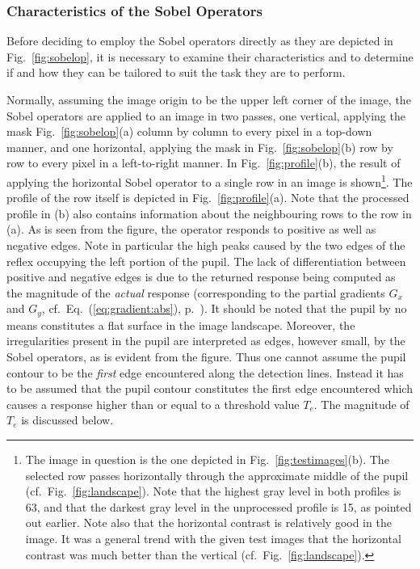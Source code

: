 \subsubsection{Characteristics of the Sobel Operators}


Before deciding to employ the Sobel operators directly as they are
depicted in Fig.~\ref{fig:sobelop}, it is necessary to examine their
characteristics and to determine if and how they can be tailored to
suit the task they are to perform.

Normally, assuming the image origin to be the upper left corner of the
image, the Sobel operators are applied to an image in two passes, one
vertical, applying the mask Fig.~\ref{fig:sobelop}(a) column by column
to every pixel in a top-down manner, and one horizontal, applying the
mask in Fig.~\ref{fig:sobelop}(b) row by row to every pixel in a
left-to-right manner.  In Fig.~\ref{fig:profile}(b), the result of
applying the horizontal Sobel operator to a single row in an image is
shown\footnote{The image in question is the one depicted in
  Fig.~\ref{fig:testimages}(b).  The selected row passes horizontally
  through the approximate middle of the pupil (cf.\ 
  Fig.~\ref{fig:landscape}).  Note that the highest gray level in both
  profiles is 63, and that the darkest gray level in the unprocessed
  profile is 15, as pointed out earlier.  Note also that the
  horizontal contrast is relatively good in the image.  It was a
  general trend with the given test images that the horizontal
  contrast was much better than the vertical (cf.\ 
  Fig.~\ref{fig:landscape}).}.  The profile of the row itself is
depicted in Fig.~\ref{fig:profile}(a).  Note that the processed
profile in (b) also contains information about the neighbouring rows
to the row in (a).  As is seen from the figure, the operator responds
to positive as well as negative edges.  Note in particular the high
peaks caused by the two edges of the reflex occupying the left portion
of the pupil.  The lack of differentiation between positive and
negative edges is due to the returned response being computed as the
magnitude of the {\em actual\/} response (corresponding to the partial
gradients $G_{x}$ and $G_{y}$, cf.\ Eq.~(\ref{eq:gradient:abs}),
p.~\pageref{eq:gradient:abs}).  It should be noted that the pupil by
no means constitutes a flat surface in the image landscape.  Moreover,
the irregularities present in the pupil are interpreted as edges,
however small, by the Sobel operators, as is evident from the figure.
Thus one cannot assume the pupil contour to be the {\em first\/} edge
encountered along the detection lines.  Instead it has to be assumed
that the pupil contour constitutes the first edge encountered which
causes a response higher than or equal to a threshold value $T_{e}$.
The magnitude of $T_{e}$ is discussed below.

